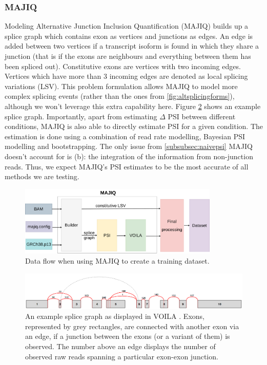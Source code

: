 \subsubsection{MAJIQ}\label{subsubsec:majiq}
Modeling Alternative Junction Inclusion Quantification (MAJIQ) builds up a splice graph \cite{majiq2} which contains exon as vertices and junctions as edges. An edge is added between two vertices if a transcript isoform is found in which they share a junction (that is if the exons are neighbours and everything between them has been spliced out).
Constitutive exons are vertices with two incoming edges.
Vertices which have more than 3 incoming edges are denoted as local splicing variations (LSV). This problem formulation allows MAJIQ to model more complex splicing events (rather than the ones from \ref{fig:altsplicingforms}), although we won't leverage this extra capability here. Figure \ref{fig:splice_graph} shows an example splice graph. Importantly, apart from estimating $\Delta$ PSI between different conditions, MAJIQ is also able to directly estimate PSI for a given condition. The estimation is done using a combination of read rate modelling, Bayesian PSI modelling and bootstrapping. The only issue from \ref{subsubsec:naivepsi} MAJIQ doesn't account for is (b): the integration of the information from non-junction reads. Thus, we expect MAJIQ's PSI estimates to be the most accurate of all methods we are testing.


\begin{figure}
	\centering\includegraphics[width=0.85\textwidth]{../visualizations/ch4-methods/visualizations-majiq.pdf} 
	\caption{Data flow when using MAJIQ to create a training dataset. }
	\label{fig:majiq_dataset_creation_process}
\end{figure}

\begin{figure}
	\centering\includegraphics[width=1\textwidth]{../visualizations/ch4-methods/splice_graph.png} 
	\caption{An example splice graph as displayed in VOILA \cite{majiq2}. Exons, represented by grey rectangles, are connected with another exon via an edge, if a junction between the exons (or a variant of them) is observed. The number above an edge displays the number of observed raw reads spanning a particular exon-exon junction.}
	\label{fig:splice_graph}
\end{figure}

